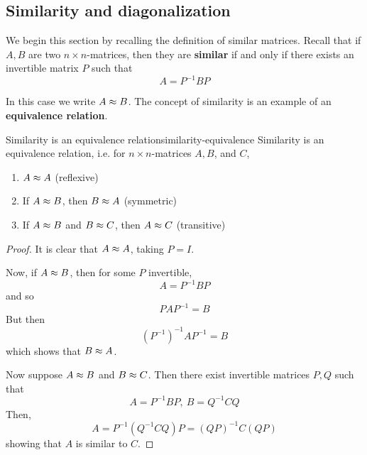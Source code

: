 \subsection{Similarity and diagonalization}

We begin this section by recalling the definition  of similar matrices. 
Recall that if $A,B$ are two $n\times n$-matrices, then they are \textbf{similar}
if and only if there exists an invertible matrix $P$
such that
\begin{equation*}
A=P^{-1}BP
\end{equation*}

In this case we write $A\approx B$. The concept of similarity is an example of an \textbf{equivalence relation}.

\begin{lemma}{Similarity is an equivalence relation}{similarity-equivalence}
Similarity is an equivalence relation, i.e. for $n \times n$-matrices $A,B$, and $C$, 
\begin{enumerate}
\item $A \approx A$ (reflexive)
\item If $A \approx B$, then $B \approx A$ (symmetric)
\item If $A \approx B$ and $B \approx C$, then $A \approx C$ (transitive)
\end{enumerate}
\end{lemma}

\begin{proof}
It is clear that $A\approx A$, taking $P=I$. 

Now, if $A\approx B$, then for some $P$ invertible,
\begin{equation*}
A=P^{-1}BP
\end{equation*}
and so
\begin{equation*}
PAP^{-1}=B
\end{equation*}
But then
\begin{equation*}
(P^{-1}) ^{-1}AP^{-1}=B
\end{equation*}
which shows that $B\approx A$.

Now suppose $A\approx B$ and $B\approx C$. Then there exist invertible matrices 
$P,Q$ such that
\begin{equation*}
A=P^{-1}BP,\ B=Q^{-1}CQ
\end{equation*}
Then,
\begin{equation*}
A=P^{-1} (Q^{-1}CQ)P=(QP) ^{-1}C(QP)
\end{equation*}
showing that $A$ is similar to $C$.
\end{proof}

